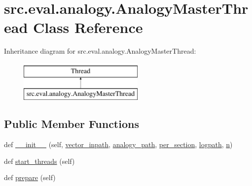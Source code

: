 \hypertarget{classsrc_1_1eval_1_1analogy_1_1_analogy_master_thread}{}\section{src.\+eval.\+analogy.\+Analogy\+Master\+Thread Class Reference}
\label{classsrc_1_1eval_1_1analogy_1_1_analogy_master_thread}
Inheritance diagram for src.\+eval.\+analogy.\+Analogy\+Master\+Thread\+:\begin{figure}[H]
\begin{center}
\leavevmode
\includegraphics[height=2.000000cm]{classsrc_1_1eval_1_1analogy_1_1_analogy_master_thread}
\end{center}
\end{figure}
\subsection*{Public Member Functions}
\begin{DoxyCompactItemize}
\item 
def \hyperlink{classsrc_1_1eval_1_1analogy_1_1_analogy_master_thread_a5dcad4f45137fd4c5c5bfaf0874eb61b}{\+\_\+\+\_\+init\+\_\+\+\_\+} (self, \hyperlink{classsrc_1_1eval_1_1analogy_1_1_analogy_master_thread_a581000df6b13c7b2d3a06a56097972f0}{vector\+\_\+inpath}, \hyperlink{classsrc_1_1eval_1_1analogy_1_1_analogy_master_thread_aa76e56284b44372302314cbd82acedd0}{analogy\+\_\+path}, \hyperlink{classsrc_1_1eval_1_1analogy_1_1_analogy_master_thread_a32028e35b91d6f3b1338aed361a9b608}{per\+\_\+section}, \hyperlink{classsrc_1_1eval_1_1analogy_1_1_analogy_master_thread_a7ef0cbb224a26fc5ccd20887e0d039d4}{logpath}, \hyperlink{classsrc_1_1eval_1_1analogy_1_1_analogy_master_thread_a5a42ba2f5b1620a230e19597d3e2492b}{n})
\item 
def \hyperlink{classsrc_1_1eval_1_1analogy_1_1_analogy_master_thread_a594eee873738ea9191b686318cc8495f}{start\+\_\+threads} (self)
\item 
def \hyperlink{classsrc_1_1eval_1_1analogy_1_1_analogy_master_thread_a0d807197214f4dfc7ad77089acd220da}{prepare} (self)
\end{DoxyCompactItemize}
